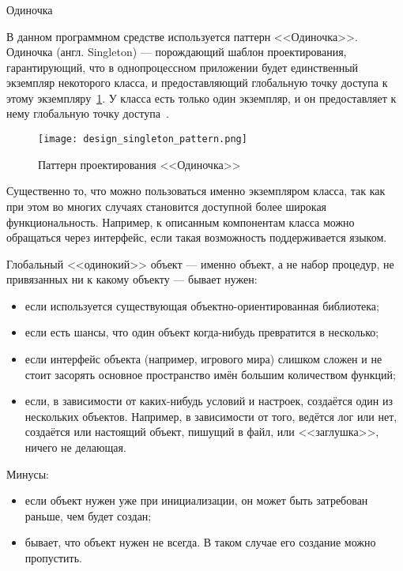 \subsubsection{}Одиночка
\

В данном программном средстве используется паттерн <<Одиночка>>.
Одиночка (англ. Singleton) — порождающий шаблон проектирования, гарантирующий, что в однопроцессном приложении будет единственный экземпляр некоторого класса, и предоставляющий глобальную точку доступа к этому экземпляру~\ref{sec:modeling:singleton}. У класса есть только один экземпляр, и он предоставляет к нему глобальную точку доступа~\cite{design_patterns}. 

\begin{figure}[ht]
\centering
    \texttt{[image: design\_singleton\_pattern.png]}
    \caption{Паттерн проектирования <<Одиночка>>}
    \label{sec:modeling:singleton}
\end{figure}

Существенно то, что можно пользоваться именно экземпляром класса, так как при этом во многих случаях становится доступной более широкая функциональность. Например, к описанным компонентам класса можно обращаться через интерфейс, если такая возможность поддерживается языком.

Глобальный <<одинокий>> объект — именно объект, а не набор процедур, не привязанных ни к какому объекту — бывает нужен:

\begin{itemize}
    \item если используется существующая объектно-ориентированная библиотека;
    \item если есть шансы, что один объект когда-нибудь превратится в несколько;
    \item если интерфейс объекта (например, игрового мира) слишком сложен и не стоит засорять основное пространство имён большим количеством функций;
    \item если, в зависимости от каких-нибудь условий и настроек, создаётся один из нескольких объектов. Например, в зависимости от того, ведётся лог или нет, создаётся или настоящий объект, пишущий в файл, или <<заглушка>>, ничего не делающая.
\end{itemize}

Минусы:
\begin{itemize}
    \item если объект нужен уже при инициализации, он может быть затребован раньше, чем будет создан;
    \item бывает, что объект нужен не всегда. В таком случае его создание можно пропустить.
\end{itemize}

